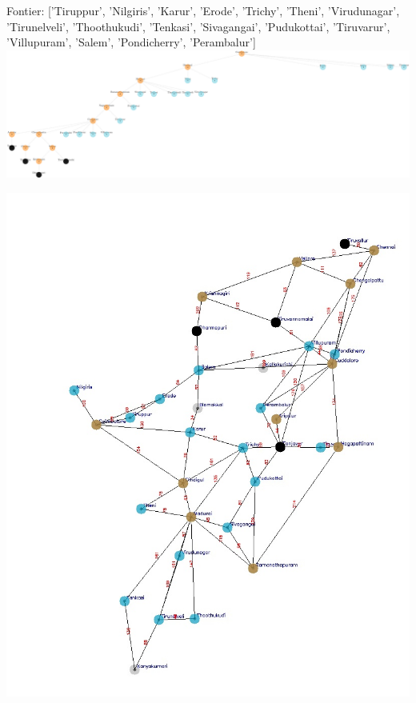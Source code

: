 \documentclass[xcolor=table]{beamer}
\begin{document}
\begin{frame}
  { \tiny Fontier: ['Tiruppur', 'Nilgiris', 'Karur', 'Erode', 'Trichy', 'Theni', 'Virudunagar', 'Tirunelveli', 'Thoothukudi', 'Tenkasi', 'Sivagangai', 'Pudukottai', 'Tiruvarur', 'Villupuram', 'Salem', 'Pondicherry', 'Perambalur']}
  \includegraphics[width=1\textwidth]{../DFSNodes/21-1.png}
  \begin{center}
    \includegraphics[height=0.45\textheight]{../DFSoutput/tamilDFS19.jpg}
  \end{center}
\end{frame}
\end{document}
